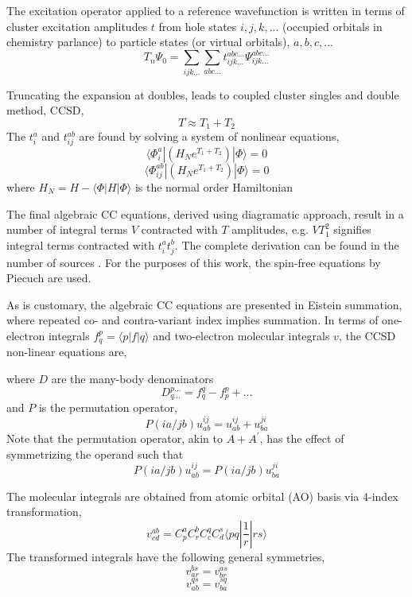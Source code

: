 \documentclass[12pt]{article} \usepackage[margin=1in]{geometry}
\newcommand{\bra}[1]{\langle #1|}
\newcommand{\ket}[1]{|#1\rangle}
\begin{document}
The excitation operator applied to a reference wavefunction is written
in terms of cluster excitation amplitudes $t$ from hole states $i,j,k,...$
(occupied orbitals in chemistry parlance) to particle states 
(or virtual orbitals), $a,b,c,...$
$$T_n \Psi_0 = \sum_{ijk...} \sum_{abc...} t_{ijk...} ^ {abc...}
\Psi_{ijk...} ^ {abc...}$$

Truncating the expansion at doubles, leads to coupled cluster singles
and double method, CCSD,
$$T \approx T _1 + T_2$$
The $t^a_i$ and $t^{ab}_{ij}$ are found by solving a system of nonlinear
equations,
$$\bra{\Phi^a_i} (H_N e^{T_1 + T_2}) \ket{\Phi} = 0$$
$$\bra{\Phi^{ab}_{ij}} (H_N e^{T_1 + T_2}) \ket{\Phi} = 0$$
where $H_N = H - \bra{\Phi} H \ket{\Phi}$ is the normal order
Hamiltonian \cite{yarkony1995modern}

The final algebraic CC equations, derived using diagramatic
approach, result in a number of integral terms $V$ contracted with
$T$ amplitudes, e.g. $VT_1^2$ signifies integral terms contracted with
$t_i^a t_j^b$.  The complete derivation can be found in the number of
sources \cite{shavitt2009many}.
For the purposes of this work, the spin-free equations by
Piecuch \cite{Piecuch2002efficient} are used.

As is customary, the algebraic CC equations are presented in Eistein
summation, where repeated co- and contra-variant index implies
summation.
In terms of one-electron integrals $f^p_q = \bra{p} f \ket{q}$ and
two-electron molecular integrals $v$, the CCSD non-linear equations are,



where $D$ are the many-body denominators
$$D^{p...}_{q...} = f^q_q - f^p_p + ...$$
and $P$ is the permutation operator,
$$P(ia/jb)u^{ij}_{ab} = u^{ij}_{ab} + u^{ji}_{ba}$$
Note that the permutation operator, akin to $A + A^{'}$, has the effect
of symmetrizing the operand such that
$$P(ia/jb)u^{ij}_{ab} = P(ia/jb)u^{ji}_{ba}$$

The molecular integrals are obtained from atomic orbital (AO) basis
via 4-index transformation,
$$v^{ab}_{cd} = C^a_p C^b_r C_c^q C_d^s \bra{pq} \frac{1}{r}
\ket{rs}$$
The transformed integrals have the following general symmetries,
$$v_{ar}^{bs} = v_{br}^{as}$$
$$v_{ab}^{qs} = v_{ba}^{sq}$$
\end{document}
